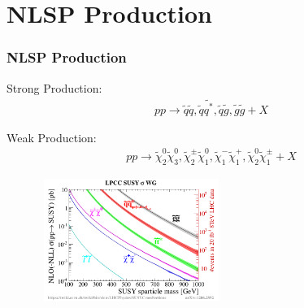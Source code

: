 \documentclass[12pt]{beamer}
\begin{document}
\section{NLSP Production}
\begin{frame}
\frametitle{NLSP Production}
\begin{varblock}[15cm]{Strong Production:}
\vspace{0pt}
\begin{equation}\label{eq1}
\left.\begin{aligned}
pp\rightarrow \tilde{q}\tilde{q}, \tilde{q}\tilde{q^{*}}, \tilde{q}\tilde{g},\tilde{g}\tilde{g}  + X 
\end{aligned}\right.
\end{equation}
\end{varblock}
\vspace{0pt}
\begin{varblock}[15cm]{Weak Production:}
\vspace{0pt}
\begin{equation}\label{eq2}
\left.\begin{aligned}
pp\rightarrow \tilde{\chi}^{0}_{2}\tilde{\chi}^{0}_{3}, \tilde{\chi}^{\pm}_{2}\tilde{\chi}^{0}_{1}, \tilde{\chi}^{-}_{1}\tilde{\chi}^{+}_{1},\tilde{\chi}^{0}_{2}\tilde{\chi}^{\pm}_{1}  + X 
\end{aligned}\right.
\end{equation}
\end{varblock}
\begin{varblock}[15cm]{}
\begin{figure}
\includegraphics[width=6cm,height=4cm, scale=0.4]{PLOTS/SUSY_Xsec.png}
\end{figure}
\end{varblock}





\end{frame}
\end{document}
